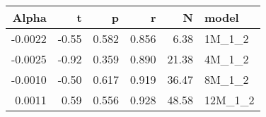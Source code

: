 \begin{table}[ht]
\centering
\begin{tabular}{rrrrrl}
  \hline
Alpha & t & p & r & N & model \\ 
  \hline
-0.0022 & -0.55 & 0.582 & 0.856 & 6.38 & 1M\_1\_2 \\ 
  -0.0025 & -0.92 & 0.359 & 0.890 & 21.38 & 4M\_1\_2 \\ 
  -0.0010 & -0.50 & 0.617 & 0.919 & 36.47 & 8M\_1\_2 \\ 
  0.0011 & 0.59 & 0.556 & 0.928 & 48.58 & 12M\_1\_2 \\ 
   \hline
\end{tabular}
\end{table}

